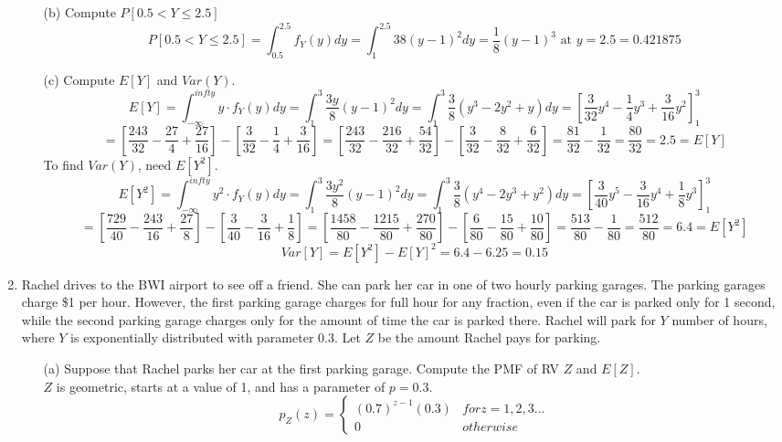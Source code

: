 \documentclass{report}
\begin{document}
\begin{enumerate}
\begin{itemize}
  \item[(b)] Compute $P[0.5<Y \leq 2.5 ]$ \\
  $$ P[0.5<Y \leq 2.5 ] = \int_{0.5}^{2.5} f_Y(y) dy = \int_{1}^{2.5} {3}{8}(y-1)^2 dy = \frac{1}{8}(y-1)^3 \text{ at } y=2.5 = 0.421875 $$
  \item[(c)] Compute $E[Y]$ and $Var(Y)$. \\
  $$ E[Y] = \int_{-\infty}^{infty}y \cdot f_Y(y) dy = \int_{1}^{3} \frac{3y}{8}(y-1)^2 dy = \int_{1}^{3} \frac{3}{8}(y^3 - 2y^2 + y) dy = [\frac{3}{32}y^4 - \frac{1}{4}y^3 + \frac{3}{16}y^2]_{1}^{3} $$
$$ = [\frac{243}{32} - \frac{27}{4} + \frac{27}{16}] - [\frac{3}{32} - \frac{1}{4} + \frac{3}{16}] = [\frac{243}{32} - \frac{216}{32} + \frac{54}{32}] - [\frac{3}{32} - \frac{8}{32} + \frac{6}{32}]  = \frac{81}{32} - \frac{1}{32} = \frac{80}{32} = 2.5 = E[Y]   $$
To find $Var(Y)$, need $E[Y^2]$.
$$ E[Y^2] = \int_{-\infty}^{infty}y^2 \cdot f_Y(y) dy = \int_{1}^{3} \frac{3y^2}{8}(y-1)^2 dy = \int_{1}^{3} \frac{3}{8}(y^4 - 2y^3 + y^2) dy = [\frac{3}{40}y^5 - \frac{3}{16}y^4 + \frac{1}{8}y^3]_{1}^{3} $$
$$ = [\frac{729}{40} - \frac{243}{16} + \frac{27}{8}] - [\frac{3}{40} - \frac{3}{16} + \frac{1}{8}] = [\frac{1458}{80} - \frac{1215}{80} + \frac{270}{80}] - [\frac{6}{80} - \frac{15}{80} + \frac{10}{80}] = \frac{513}{80} - \frac{1}{80} = \frac{512}{80} = 6.4 = E[Y^2] $$
$$ Var[Y] = E[Y^2] - E[Y]^2 = 6.4-6.25 = 0.15 $$
\end{itemize}
\item Rachel drives to the BWI airport to see off a friend. She can park her car in one of two hourly
parking garages. The parking garages charge \$1 per hour. However, the first parking garage charges
for full hour for any fraction, even if the car is parked only for 1 second, while the second parking
garage charges only for the amount of time the car is parked there. Rachel will park for $Y$ number of
hours, where $Y$ is exponentially distributed with parameter 0.3. Let $Z$ be the amount Rachel pays for
parking.
\begin{itemize}
    \item[(a)] Suppose that Rachel parks her car at the first parking garage. Compute the PMF of RV $Z$ and $E[Z]$.\\
    $Z$ is geometric, starts at a value of 1, and has a parameter of $p= 0.3$.
    $$ p_Z(z) = \left. \begin{cases}
    (0.7)^{z-1}(0.3) & for z = 1,2,3... \\
    0 & otherwise
    \end{cases} \right.$$

\end{itemize}
\end{enumerate}
\end{document}
